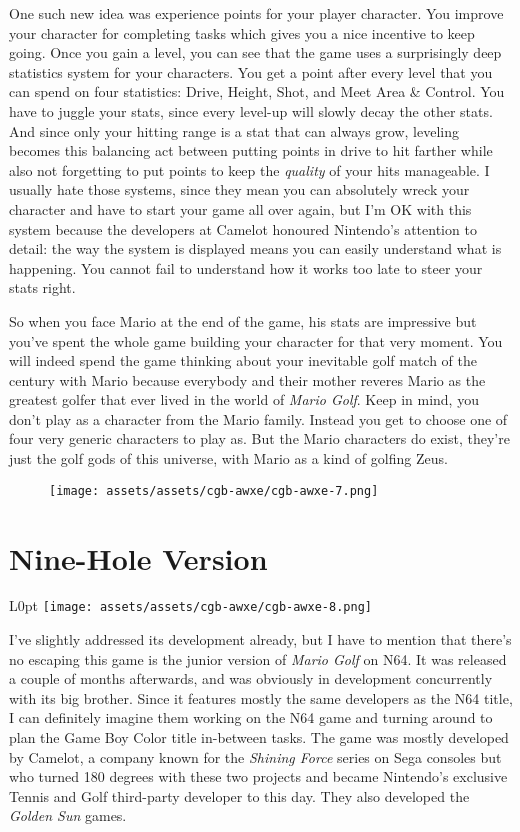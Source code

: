 \documentclass{book}
\begin{document}
One such new idea was experience points for your player character. You improve your character for completing tasks which gives you a nice incentive to keep going. Once you gain a level, you can see that the game uses a surprisingly deep statistics system for your characters. You get a point after every level that you can spend on four statistics: Drive, Height, Shot, and Meet Area \& Control. You have to juggle your stats, since every level-up will slowly decay the other stats. And since only your hitting range is a stat that can always grow, leveling becomes this balancing act between putting points in drive to hit farther while also not forgetting to put points to keep the \emph{quality} of your hits manageable. I usually hate those systems, since they mean you can absolutely wreck your character and have to start your game all over again, but I’m OK with this system because the developers at Camelot honoured Nintendo’s attention to detail: the way the system is displayed means you can easily understand what is happening. You cannot fail to understand how it works too late to steer your stats right.

So when you face Mario at the end of the game, his stats are impressive but you’ve spent the whole game building your character for that very moment. You will indeed spend the game thinking about your inevitable golf match of the century with Mario because everybody and their mother reveres Mario as the greatest golfer that ever lived in the world of \emph{Mario Golf}. Keep in mind, you don’t play as a character from the Mario family. Instead you get to choose one of four very generic characters to play as. But the Mario characters do exist, they’re just the golf gods of this universe, with Mario as a kind of golfing Zeus.

\begin{figure}[hbt]
\vskip 10pt
\centering \texttt{[image: assets/assets/cgb-awxe/cgb-awxe-7.png]}
\vskip 6pt
\end{figure}

\FloatBarrier\needspace{10mm}\section*{Nine-Hole Version}\nopagebreak[4]

\begin{wrapfigure}{L}{0pt} \texttt{[image: assets/assets/cgb-awxe/cgb-awxe-8.png]}\end{wrapfigure}
I’ve slightly addressed its development already, but I have to mention that there’s no escaping this game is the junior version of \emph{Mario Golf} on N64. It was released a couple of months afterwards, and was obviously in development concurrently with its big brother. Since it features mostly the same developers as the N64 title, I can definitely imagine them working on the N64 game and turning around to plan the Game Boy Color title in-between tasks. The game was mostly developed by Camelot, a company known for the \emph{Shining Force} series on Sega consoles but who turned 180 degrees with these two projects and became Nintendo’s exclusive Tennis and Golf third-party developer to this day. They also developed the \emph{Golden Sun} games.
\end{document}
